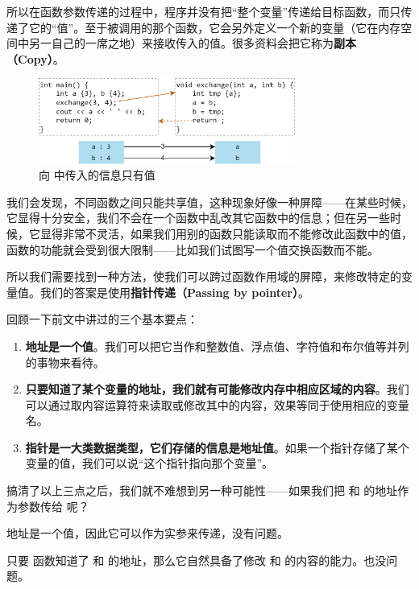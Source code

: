 所以在函数参数传递的过程中，程序并没有把``整个变量''传递给目标函数，而只传递了它的``值''。至于被调用的那个函数，它会另外定义一个新的变量（它在内存空间中另一自己的一席之地）来接收传入的值。很多资料会把它称为\textbf{副本（Copy）}。\par
\begin{figure}[htbp]
    \centering
    \includegraphics[width=0.75\textwidth]{../images/generalized_parts/05_process_of_pass_by_value_300.png}
    \caption{\lstinline@main@ 向 \lstinline@exchange@ 中传入的信息只有值}
\end{figure}
我们会发现，不同函数之间只能共享值，这种现象好像一种屏障——在某些时候，它显得十分安全，我们不会在一个函数中乱改其它函数中的信息；但在另一些时候，它显得非常不灵活，如果我们用别的函数只能读取而不能修改此函数中的值，函数的功能就会受到很大限制——比如我们试图写一个值交换函数而不能。\par
所以我们需要找到一种方法，使我们可以跨过函数作用域的屏障，来修改特定的变量值。我们的答案是使用\textbf{指针传递（Passing by pointer）}。\par
回顾一下前文中讲过的三个基本要点：
\begin{enumerate}
    \item \textbf{地址是一个值}。我们可以把它当作和整数值、浮点值、字符值和布尔值等并列的事物来看待。
    \item \textbf{只要知道了某个变量的地址，我们就有可能修改内存中相应区域的内容}。我们可以通过取内容运算符来读取或修改其中的内容，效果等同于使用相应的变量名。
    \item \textbf{指针是一大类数据类型，它们存储的信息是地址值}。如果一个指针存储了某个变量的值，我们可以说``这个指针指向那个变量''。
\end{enumerate}\par
搞清了以上三点之后，我们就不难想到另一种可能性——如果我们把 \lstinline@a@ 和 \lstinline@b@ 的地址作为参数传给 \lstinline@exchange@ 呢？\par
地址是一个值，因此它可以作为实参来传递，没有问题。\par
只要 \lstinline@exchange@ 函数知道了 \lstinline@a@ 和 \lstinline@b@ 的地址，那么它自然具备了修改 \lstinline@a@ 和 \lstinline@b@ 的内容的能力。也没问题。\par

